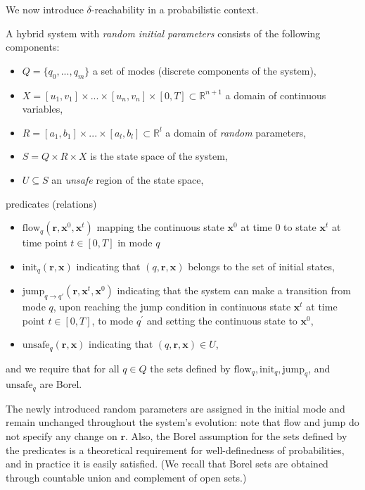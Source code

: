 We now introduce $\delta$-reachability in a probabilistic context.

\begin{definition}\label{def:pHS}
A hybrid system with {\em random initial parameters} consists of the following components:
\begin{itemize}
\item $Q = \{q_0, ..., q_m\}$ a set of modes (discrete components of the system),
\item $X = [u_1, v_1] \times ... \times [u_n, v_n] \times [0, T] \subset \mathbb{R}^{n+1}$ a domain 
	of continuous variables,
\item $R = [a_1, b_1] \times ... \times [a_l, b_l] \subset \mathbb{R}^{l}$ a domain of {\em random}
	parameters,
\item $S = Q \times R \times X$ is the state space of the system,
\item $U \subseteq S$ an {\em unsafe} region of the state space,
\end{itemize}
predicates (relations)
\begin{itemize}
	\item $\text{flow}_{q}(\textbf{r}, \textbf{x}^{0}, \textbf{x}^{t})$ mapping the continuous state 
	$\textbf{x}^{0}$ at time 0 to state $\textbf{x}^{t}$ at time point $t \in [0, T]$ in mode $q$
	\item $\text{init}_q(\textbf{r}, \textbf{x})$ indicating that $ (q, \textbf{r}, \textbf{x})$ 
	belongs to the set of initial states,
	\item $\text{jump}_{q \rightarrow q'}(\textbf{r}, \textbf{x}^{t}, \textbf{x}^{0})$ indicating that the 
	system can make a transition from mode $q$, upon reaching the jump condition in continuous 
	state $\textbf{x}^{t}$ at time point $t \in [0, T]$, to mode $q^\prime$ and setting the
	continuous state to $\textbf{x}^{0}$,
	\item $\text{unsafe}_{q}(\textbf{r}, \textbf{x})$ indicating that 
	$(q, \textbf{r}, \textbf{x}) \in U$,
\end{itemize}
and we require that for all $q\in Q$ the sets defined by $\text{flow}_q, \text{init}_q, \text{jump}_q$,
and $\text{unsafe}_q$ are Borel.
\end{definition}
\begin{remark}
The newly introduced random parameters are assigned in the initial mode and remain unchanged throughout
the system's evolution: note that flow and jump do not specify any change on $\textbf{r}$. Also, the
Borel assumption for the sets defined by the predicates is a theoretical requirement for well-definedness
of probabilities, and in practice it is easily satisfied. (We recall that Borel sets are obtained
through countable union and complement of open sets.)
\end{remark}

